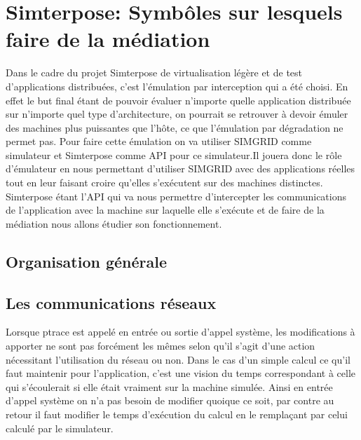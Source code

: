 
\section{Simterpose: Symbôles sur lesquels faire de la médiation}
\label{section:simterpose}
Dans le cadre du projet Simterpose de virtualisation légère et de test
d'applications distribuées, c'est l'émulation par interception qui a
été choisi. En effet le but final étant de pouvoir évaluer n'importe
quelle application distribuée sur n'importe quel type d'architecture,
on pourrait se retrouver à devoir émuler des machines plus puissantes
que l'hôte, ce que l'émulation par dégradation ne permet
pas. {\color{red}Pour faire cette émulation on va utiliser SIMGRID
  comme simulateur et Simterpose comme API pour ce simulateur.Il
  jouera donc le rôle d'émulateur en nous permettant d'utiliser
  SIMGRID avec des applications réelles tout en leur faisant croire
  qu'elles s'exécutent sur des machines distinctes. Simterpose étant
  l'API qui va nous permettre d'intercepter les communications de
  l'application avec la machine sur laquelle elle s'exécute et de
  faire de la médiation nous allons étudier son fonctionnement.}

\subsection{Organisation générale}

\subsection{Les communications réseaux}

Lorsque ptrace est appelé en entrée ou sortie d'appel système, les
modifications à apporter ne sont pas forcément les mêmes selon qu'il
s'agit d'une action nécessitant l'utilisation du réseau ou non. Dans
le cas d'un simple calcul ce qu'il faut maintenir pour l'application,
c'est une vision du temps correspondant à celle qui s'écoulerait si
elle était vraiment sur la machine simulée. Ainsi en entrée d'appel
système on n'a pas besoin de modifier quoique ce soit, par contre au
retour il faut modifier le temps d'exécution du calcul en le
remplaçant par celui calculé par le simulateur.

